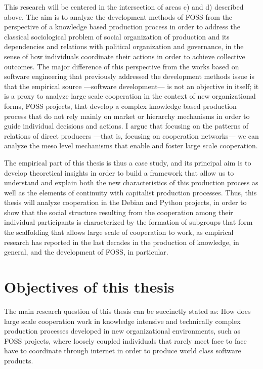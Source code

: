 This research will be centered in the intersection of areas c) and d) described above. The aim is to analyze the development methods of FOSS from the perspective of a knowledge based production process in order to address the classical sociological problem of social organization of production and its dependencies and relations with political organization and governance, in the sense of how individuals coordinate their actions in order to achieve collective outcomes. The major difference of this perspective from the works based on software engineering that previously addressed the development methods issue is that the empirical source ---software development--- is not an objective in itself; it is a proxy to analyze large scale cooperation in the context of new organizational forms, FOSS projects, that develop a complex knowledge based production process that do not rely mainly on market or hierarchy mechanisms in order to guide individual decisions and actions. I argue that focusing on the patterns of relations of direct producers ---that is, focusing on cooperation networks--- we can analyze the meso level mechanisms that enable and foster large scale cooperation.

The empirical part of this thesis is thus a case study, and its principal aim is to develop theoretical insights in order to build a framework that allow us to understand and explain both the new characteristics of this production process as well as the elements of continuity with capitalist production processes. Thus, this thesis will analyze cooperation in the Debian and Python projects, in order to show that the social structure resulting from the cooperation among their individual participants is characterized by the formation of subgroups that form the scaffolding that allows large scale of cooperation to work, as empirical research has reported in the last decades in the production of knowledge, in general, and the development of FOSS, in particular.

\section{Objectives of this thesis}

The main research question of this thesis can be succinctly stated as: How does large scale cooperation work in knowledge intensive and technically complex production processes developed in new organizational environments, such as FOSS projects, where loosely coupled individuals that rarely meet face to face have to coordinate through internet in order to produce world class software products.

